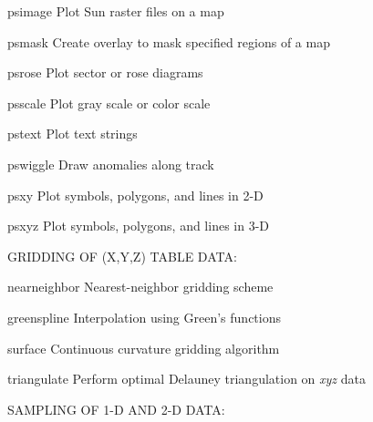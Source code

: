 \documentclass{article}
\begin{document}
\par 	psimage	Plot Sun raster files on a map\par 

\par 	psmask	Create overlay to mask specified regions of a map\par 

\par 	psrose	Plot sector or rose diagrams\par 

\par 	psscale	Plot gray scale or color scale\par 

\par 	pstext	Plot text strings\par 

\par 	pswiggle	Draw anomalies along track\par 

\par 	psxy	Plot symbols, polygons, and lines in 2-D\par 

\par 	psxyz	Plot symbols, polygons, and lines in 3-D\par 

\par \par 

\par GRIDDING OF (X,Y,Z) TABLE DATA:\par 

\par 	nearneighbor	Nearest-neighbor gridding scheme\par 

\par 	greenspline	Interpolation using Green's functions\par 

\par 	surface	Continuous curvature gridding algorithm\par 

\par 	triangulate	Perform optimal Delauney triangulation on \emph{xyz} data\par 

\par \par 

\par SAMPLING OF 1-D AND 2-D DATA:\par 
\end{document}
